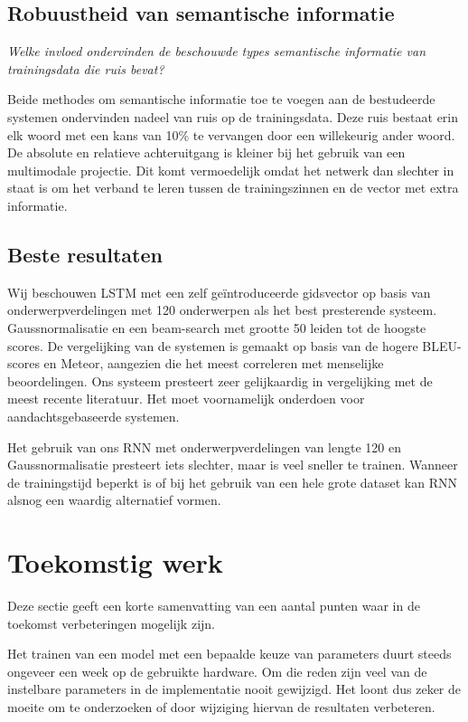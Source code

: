 \subsection{Robuustheid van semantische informatie}
\emph{Welke invloed ondervinden de beschouwde types semantische informatie van trainingsdata die ruis bevat?}

Beide methodes om semantische informatie toe te voegen aan de bestudeerde systemen ondervinden nadeel van ruis op de trainingsdata. Deze ruis bestaat erin elk woord met een kans van 10\% te vervangen door een willekeurig ander woord. De absolute en relatieve achteruitgang is kleiner bij het gebruik van een multimodale projectie. Dit komt vermoedelijk omdat het netwerk dan slechter in staat is om het verband te leren tussen de trainingszinnen en de vector met extra informatie.

\subsection{Beste resultaten}
Wij beschouwen LSTM met een zelf ge\"introduceerde gidsvector op basis van onderwerpverdelingen met 120 onderwerpen als het best presterende systeem. Gaussnormalisatie en een beam-search met grootte 50 leiden tot de hoogste scores.  De vergelijking van de systemen is gemaakt op basis van de hogere BLEU-scores en Meteor, aangezien die het meest correleren met menselijke beoordelingen. Ons systeem presteert zeer gelijkaardig in vergelijking met de meest recente literatuur. Het moet voornamelijk onderdoen voor aandachtsgebaseerde systemen. 

Het gebruik van ons RNN met onderwerpverdelingen van lengte 120 en Gaussnormalisatie presteert iets slechter, maar is veel sneller te trainen. Wanneer de trainingstijd beperkt is of bij het gebruik van een hele grote dataset kan RNN alsnog een waardig alternatief vormen.

\section{Toekomstig werk}
Deze sectie geeft een korte samenvatting van een aantal punten waar in de toekomst verbeteringen mogelijk zijn.

Het trainen van een model met een bepaalde keuze van parameters duurt steeds ongeveer een week op de gebruikte hardware. Om die reden zijn veel van de instelbare parameters in de implementatie nooit gewijzigd. Het loont dus zeker de moeite om te onderzoeken of door wijziging hiervan de resultaten verbeteren.

